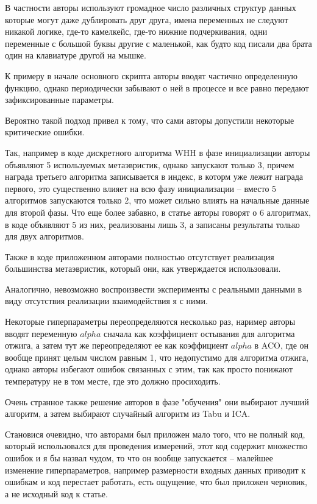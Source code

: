 \documentclass[a4paper,12pt]{extarticle}
\begin{document}
В частности авторы используют громадное число различных структур данных которые могут даже дублировать друг друга, имена переменных не следуют никакой логике, где-то камелкейс, где-то нижние подчеркивания, одни переменные с большой буквы другие с маленькой, как будто код писали два брата один на клавиатуре другой на мышке.

К примеру в начале основного скрипта авторы вводят частично определенную функцию, однако периодически забывают о ней в процессе и все равно передают зафиксированные параметры.

Вероятно такой подход привел к тому, что сами авторы допустили некоторые критические ошибки.

Так, например в коде дискретного алгоритма WHH в фазе инициализации авторы объявляют 5 используемых метаэвристик, однако запускают только 3, причем награда третьего алгоритма записывается в индекс, в которм уже лежит награда первого, это существенно влияет на всю фазу инициализации -- вместо 5 алгоритмов запускаются только 2, что может сильно влиять на начальные данные для второй фазы. Что еще более забавно, в статье авторы говорят о 6 алгоритмах, в коде объявляют 5 из них, реализованы лишь 3, а записаны результаты только для двух алгоритмов.

Также в коде приложенном авторами полностью отсутствует реализация большинства метаэвристик, который они, как утверждается использовали.

Аналогично, невозможно воспроизвести эксперименты с реальными данными в виду отсутствия реализации взаимодействия я с ними.

Некоторые гиперпараметры переопределяются несколько раз, наример авторы вводят переменную $alpha$ сначала как коэффициент остывания для алгоритма отжига, а затем тут же переопределяют ее как коэффициент $alpha$ в ACO, где он вообще принят целым числом равным 1, что недопустимо для алгоритма отжига, однако авторы избегают ошибок связанных с этим, так как просто понижают температуру не в том месте, где это должно просиходить.

Очень странное также решение авторов в фазе "обучения" они выбирают лучший алгоритм, а затем выбирают случайный алгоритм из Tabu и ICA.

Становися очевидно, что авторами был приложен мало того, что не полный код, который использовался для проведения измерений, этот код содержит множество ошибок и я бы назвал чудом, то что он вообще запускается -- малейшее изменение гиперпараметров, например размерности входных данных приводит к ошибкам и код перестает работать, есть ощущение, что был приложен черновик, а не исходный код к статье.
\end{document}
